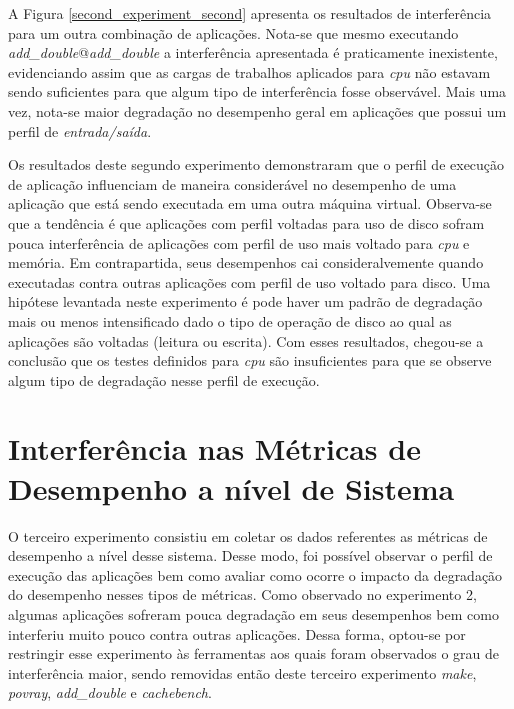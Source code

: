 A Figura \ref{second_experiment_second} apresenta os resultados de interferência para um outra combinação de aplicações. Nota-se que mesmo executando \textit{add\_double}@\textit{add\_double} a interferência apresentada é praticamente inexistente, evidenciando assim que as cargas de trabalhos aplicados para \textit{cpu} não estavam sendo suficientes para que algum tipo de interferência fosse observável. Mais uma vez, nota-se maior degradação no desempenho geral em aplicações que possui um perfil de \textit{entrada/saída}.

Os resultados deste segundo experimento demonstraram que o perfil de execução de aplicação influenciam de maneira considerável no desempenho de uma aplicação que está sendo executada em uma outra máquina virtual. Observa-se que a tendência é que aplicações com perfil voltadas para uso de disco sofram pouca interferência de aplicações com perfil de uso mais voltado para \textit{cpu} e memória. Em contrapartida, seus desempenhos cai consideralvemente quando executadas contra outras aplicações com perfil de uso voltado para disco. Uma hipótese levantada neste experimento é pode haver um padrão de degradação mais ou menos intensificado dado o tipo de operação de disco ao qual as aplicações são voltadas (leitura ou escrita). Com esses resultados, chegou-se a conclusão que os testes definidos para \textit{cpu} são insuficientes para que se observe algum tipo de degradação nesse perfil de execução. 

\section{Interferência nas Métricas de Desempenho a nível de Sistema}
O terceiro experimento consistiu em coletar os dados referentes as métricas de desempenho a nível desse sistema. Desse modo, foi possível observar o perfil de execução das aplicações bem como avaliar como ocorre o impacto da degradação do desempenho nesses tipos de métricas. Como observado no experimento 2, algumas aplicações sofreram pouca degradação em seus desempenhos bem como interferiu muito pouco contra outras aplicações. Dessa forma, optou-se por restringir esse experimento às ferramentas aos quais foram observados o grau de interferência maior, sendo removidas então deste terceiro experimento \textit{make}, \textit{povray}, \textit{add\_double} e \textit{cachebench}.

